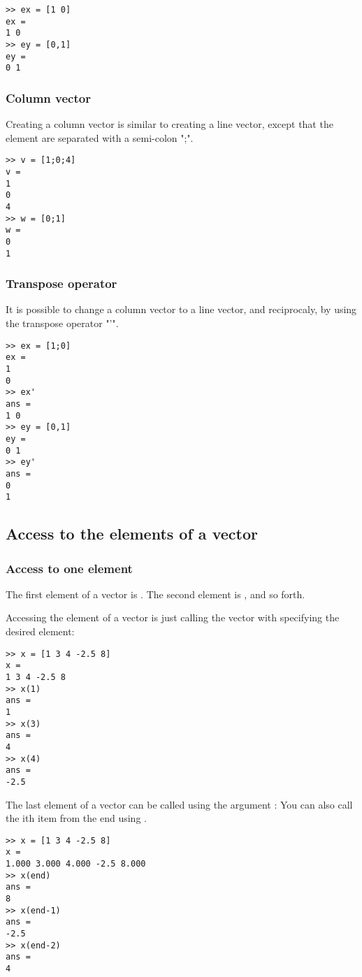 \begin{lstlisting}
>> ex = [1 0]
ex =
1 0
>> ey = [0,1]
ey =
0 1
\end{lstlisting}
 

\subsubsection{Column vector}
Creating a column vector is similar to creating a line vector, except that the element are separated with a semi-colon ";".


\begin{lstlisting}
>> v = [1;0;4]
v =
1
0
4
>> w = [0;1]
w =
0
1
\end{lstlisting}

\subsubsection{Transpose operator}
It is possible to change a column vector to a line vector, and reciprocaly, by using the transpose operator "'".
\begin{lstlisting}
>> ex = [1;0]
ex =
1
0
>> ex'
ans =
1 0
>> ey = [0,1]
ey =
0 1
>> ey'
ans =
0
1
\end{lstlisting}


\subsection{Access to the elements of a vector}

\subsubsection{Access to one element}

The first element of a vector  is .
The second element is , and so forth.

Accessing the element of a vector is just calling the vector with specifying the desired element:

\begin{lstlisting}
>> x = [1 3 4 -2.5 8]
x = 
1 3 4 -2.5 8
>> x(1)
ans = 
1
>> x(3)
ans = 
4
>> x(4)
ans = 
-2.5
\end{lstlisting}




The last element of a vector can be called using the argument :
You can also call the ith item from the end using . 
\begin{lstlisting}
>> x = [1 3 4 -2.5 8]
x = 
1.000 3.000 4.000 -2.5 8.000
>> x(end)
ans = 
8
>> x(end-1)
ans = 
-2.5
>> x(end-2)
ans = 
4
\end{lstlisting}



